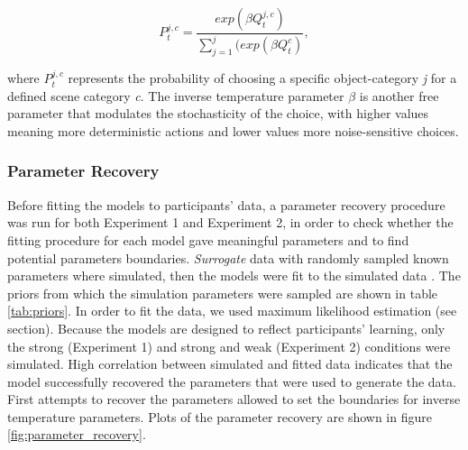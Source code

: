 \documentclass[a4paper,12pt]{article}
\begin{document}
\begin{equation}
P_t^{j,c} = \dfrac{ exp({\beta} {Q}_t^{j,c})   }
{ \sum_{j=1}^j (exp({\beta} {Q}_t^c) },  
\end{equation}

\noindent
where $P_t^{j,c}$ represents the probability of choosing a specific object-category \textit{j} for a defined scene category \textit{c}. The inverse temperature parameter $\beta$ is another free parameter that modulates the stochasticity of the choice, with higher values meaning more deterministic actions and lower values more noise-sensitive choices. 

\subsubsection{Parameter Recovery} Before fitting the models to participants' data, a parameter recovery procedure was run for both Experiment 1 and Experiment 2, in order to check whether the fitting procedure for each model gave meaningful parameters and to find potential parameters boundaries. \textit{Surrogate} data with randomly sampled known parameters where simulated, then the models were fit to the simulated data \citep[see][]{Wilson2019a}. The priors from which the simulation parameters were sampled are shown in table \ref{tab:priors}. In order to fit the data, we used maximum likelihood estimation (see section). Because the models are designed to reflect participants' learning, only the strong (Experiment 1) and strong and weak (Experiment 2) conditions were simulated. High correlation between simulated and fitted data indicates that the model successfully recovered the parameters that were used to generate the data. First attempts to recover the parameters allowed to set the boundaries for inverse temperature parameters. Plots of the parameter recovery are shown in figure \ref{fig:parameter_recovery}.




\begin{table} 
    \centering 
    \caption{Priors for the parameters}
    \label{tab:priors}
    \end{table}
\end{document}
